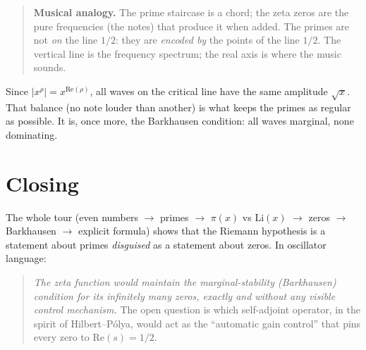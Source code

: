 \documentclass[11pt,a4paper]{article}
\begin{document}
\begin{quote}
\textbf{Musical analogy.} The prime staircase is a chord; the zeta zeros are the
pure frequencies (the notes) that produce it when added. The primes are not
\emph{on} the line $1/2$: they are \emph{encoded by} the points of the line
$1/2$. The vertical line is the frequency spectrum; the real axis is where the
music sounds.
\end{quote}

Since $|x^\rho|=x^{\mathrm{Re}(\rho)}$, all waves on the critical line have the
same amplitude $\sqrt{x}$. That balance (no note louder than another) is what
keeps the primes as regular as possible. It is, once more, the Barkhausen
condition: all waves marginal, none dominating.

\section{Closing}

The whole tour (even numbers $\to$ primes $\to$ $\pi(x)$ vs $\mathrm{Li}(x)$
$\to$ zeros $\to$ Barkhausen $\to$ explicit formula) shows that the Riemann
hypothesis is a statement about primes \emph{disguised} as a statement about
zeros. In oscillator language:

\begin{quote}
\emph{The zeta function would maintain the marginal-stability (Barkhausen)
condition for its infinitely many zeros, exactly and without any visible control
mechanism.} The open question is which self-adjoint operator, in the spirit of
Hilbert--Pólya, would act as the ``automatic gain control'' that pins every zero
to $\mathrm{Re}(s)=1/2$.
\end{quote}
\end{document}
